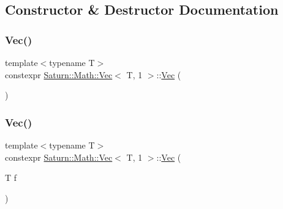 \subsection{Constructor \& Destructor Documentation}
\mbox{\label{class_saturn_1_1_math_1_1_vec_3_01_t_00_011_01_4_af9feaded166a2b4091c411e308489598}} 
\subsubsection{\texorpdfstring{Vec()}{Vec()}\hspace{0.1cm}{\footnotesize\ttfamily [1/3]}}
{\footnotesize\ttfamily template$<$typename T$>$ \\
constexpr \mbox{\hyperlink{class_saturn_1_1_math_1_1_vec}{Saturn\+::\+Math\+::\+Vec}}$<$ T, 1 $>$\+::\mbox{\hyperlink{class_saturn_1_1_math_1_1_vec}{Vec}} (\begin{DoxyParamCaption}{ }\end{DoxyParamCaption})\hspace{0.3cm}{\ttfamily [inline]}}

\mbox{\label{class_saturn_1_1_math_1_1_vec_3_01_t_00_011_01_4_a79ca7d3fe3512a7e9515ec4a156cb9d7}} 
\subsubsection{\texorpdfstring{Vec()}{Vec()}\hspace{0.1cm}{\footnotesize\ttfamily [2/3]}}
{\footnotesize\ttfamily template$<$typename T$>$ \\
constexpr \mbox{\hyperlink{class_saturn_1_1_math_1_1_vec}{Saturn\+::\+Math\+::\+Vec}}$<$ T, 1 $>$\+::\mbox{\hyperlink{class_saturn_1_1_math_1_1_vec}{Vec}} (\begin{DoxyParamCaption}\item[{T}]{f }\end{DoxyParamCaption})\hspace{0.3cm}{\ttfamily [inline]}}

